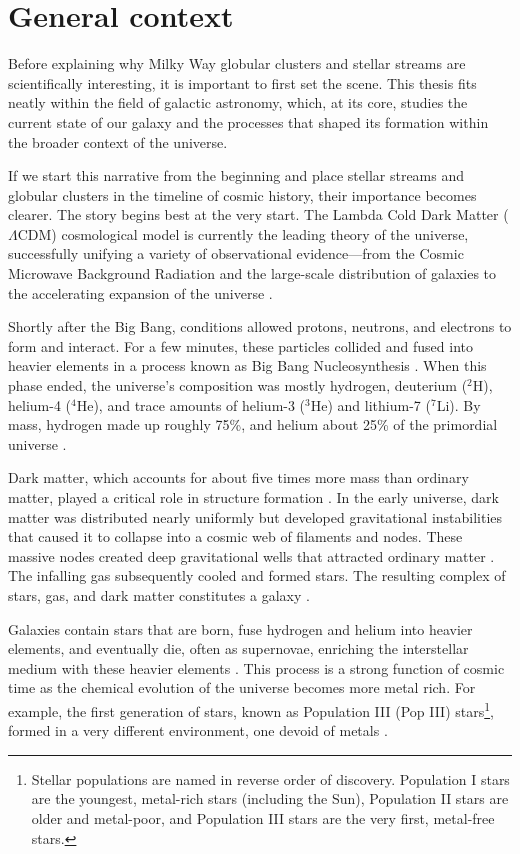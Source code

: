 \section{General context}
    Before explaining why Milky Way globular clusters and stellar streams are scientifically interesting, it is important to first set the scene. This thesis fits neatly within the field of galactic astronomy, which, at its core, studies the current state of our galaxy and the processes that shaped its formation within the broader context of the universe.

    If we start this narrative from the beginning and place stellar streams and globular clusters in the timeline of cosmic history, their importance becomes clearer. The story begins best at the very start. The Lambda Cold Dark Matter ($\Lambda$CDM) cosmological model is currently the leading theory of the universe, successfully unifying a variety of observational evidence—from the Cosmic Microwave Background Radiation and the large-scale distribution of galaxies to the accelerating expansion of the universe \citep{2001LRR.....4....1C,2022NewAR..9501659P}.

    Shortly after the Big Bang, conditions allowed protons, neutrons, and electrons to form and interact. For a few minutes, these particles collided and fused into heavier elements in a process known as Big Bang Nucleosynthesis \citep{2007ARNPS..57..463S}. When this phase ended, the universe's composition was mostly hydrogen, deuterium ($^2$H), helium-4 ($^4$He), and trace amounts of helium-3 ($^3$He) and lithium-7 ($^7$Li). By mass, hydrogen made up roughly 75\%, and helium about 25\% of the primordial universe \citep{1966ApJ...146..542P,2016RvMP...88a5004C}.

    Dark matter, which accounts for about five times more mass than ordinary matter, played a critical role in structure formation \citep{2020A&A...641A...6P}. In the early universe, dark matter was distributed nearly uniformly but developed gravitational instabilities that caused it to collapse into a cosmic web of filaments and nodes. These massive nodes created deep gravitational wells that attracted ordinary matter \citep{1974ApJ...187..425P}. The infalling gas subsequently cooled and formed stars. The resulting complex of stars, gas, and dark matter constitutes a galaxy \citep{2008LNP...740.....P,2010gfe..book.....M}.

    Galaxies contain stars that are born, fuse hydrogen and helium into heavier elements, and eventually die, often as supernovae, enriching the interstellar medium with these heavier elements \citep{2019A&ARv..27....3M}. This process is a strong function of cosmic time as the chemical evolution of the universe becomes more metal rich. For example, the first generation of stars, known as Population III (Pop III) stars\footnote{Stellar populations are named in reverse order of discovery. Population I stars are the youngest, metal-rich stars (including the Sun), Population II stars are older and metal-poor, and Population III stars are the very first, metal-free stars.}, formed in a very different environment, one devoid of metals \citep{2002Sci...295...93A,2005SSRv..117..445G,2013RPPh...76k2901B}. 

